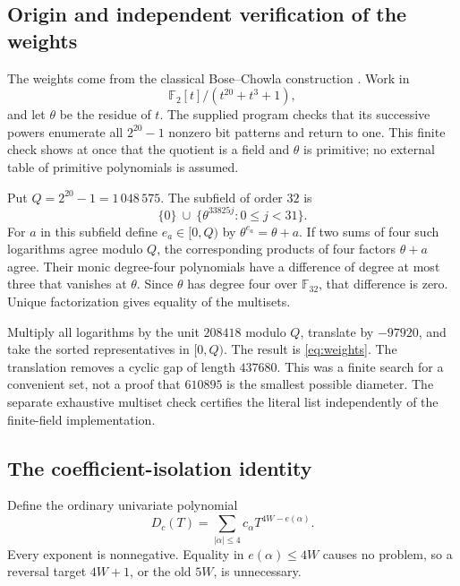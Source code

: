 \documentclass[11pt,letterpaper]{article}
\theoremstyle{remark}
\begin{document}
\subsection{Origin and independent verification of the weights}

The weights come from the classical Bose--Chowla construction
\cite{bosechowla}. Work in
\[
\mathbb F_2[t]/(t^{20}+t^3+1),
\]
and let \(\theta\) be the residue of \(t\). The supplied program checks
that its successive powers enumerate all \(2^{20}-1\) nonzero bit
patterns and return to one. This finite check shows at once that the
quotient is a field and \(\theta\) is primitive; no external table of
primitive polynomials is assumed.

Put \(Q=2^{20}-1=1\,048\,575\). The subfield of order \(32\) is
\[
\{0\}\ \cup\ \{\theta^{33825j}:0\le j<31\}.
\]
For \(a\) in this subfield define \(e_a\in[0,Q)\) by
\(\theta^{e_a}=\theta+a\). If two sums of four such logarithms agree
modulo \(Q\), the corresponding products of four factors \(\theta+a\)
agree. Their monic degree-four polynomials have a difference of degree
at most three that vanishes at \(\theta\). Since \(\theta\) has degree
four over \(\mathbb F_{32}\), that difference is zero. Unique
factorization gives equality of the multisets.

Multiply all logarithms by the unit \(208418\) modulo \(Q\), translate
by \(-97920\), and take the sorted representatives in \([0,Q)\).
The result is \eqref{eq:weights}. The translation removes a cyclic
gap of length \(437680\). This was a finite search for a convenient
set, not a proof that \(610895\) is the smallest possible diameter.
The separate exhaustive multiset check certifies the literal list
independently of the finite-field implementation.

\subsection{The coefficient-isolation identity}

Define the ordinary univariate polynomial
\begin{equation}
D_c(T)=\sum_{|\alpha|\le4}c_\alpha T^{4W-e(\alpha)}.
\label{eq:dcode}
\end{equation}
Every exponent is nonnegative. Equality in \(e(\alpha)\le4W\) causes
no problem, so a reversal target \(4W+1\), or the old \(5W\), is unnecessary.
\end{document}

